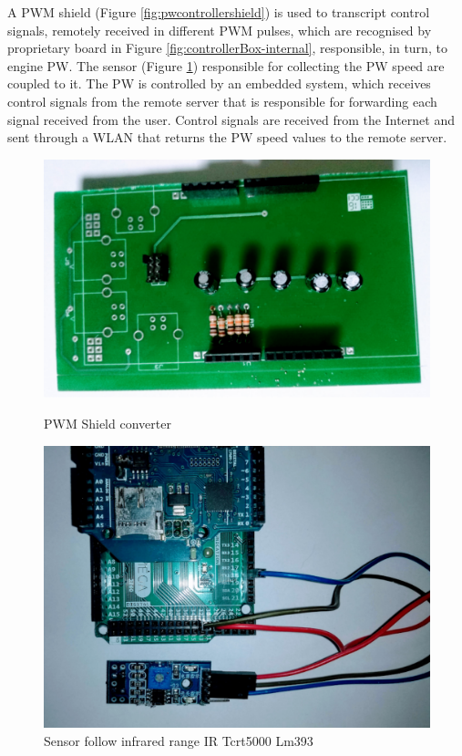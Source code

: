 A  PWM shield  (Figure \ref{fig:pwcontrollershield}) is used to transcript control signals, remotely received in different PWM pulses, which are recognised by proprietary board in Figure \ref{fig:controllerBox-internal}, responsible, in turn, to engine PW. The sensor (Figure \ref{fig:speedsensor}) responsible for collecting the PW speed are coupled to it. The PW is controlled by an embedded system, which receives control signals from the remote server that is responsible for forwarding each signal received from the user. Control signals are received from the Internet and sent through a WLAN that returns the PW speed values to the remote server.


\begin{figure}[!htbp]
\center
\begin{minipage}{0.495\linewidth}
\center
\captionsetup{justification=centering,margin=0.5cm,font=small}
\includegraphics[width=0.95\linewidth]{img/cap4/pwcontrollershield}
\caption{PWM Shield converter} \label{fig:pwcontrollershield}
\end{minipage}
\begin{minipage}{0.495\linewidth}
\center
\captionsetup{justification=centering,margin=0cm,font=small}
\includegraphics[width=0.8\linewidth]{img/cap4/speedsensor}
\caption{Sensor follow infrared range IR Tcrt5000 Lm393} \label{fig:speedsensor}
\end{minipage}
\end{figure}

